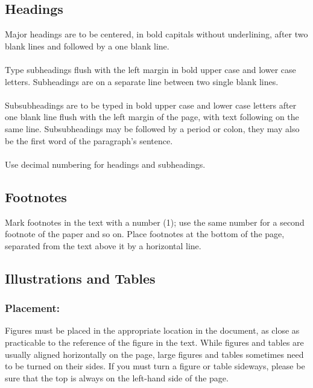 \documentclass{isprs}
\begin{document}
\subsection{Headings}\label{sec:Headings}

Major headings are to be centered, in bold capitals without 
underlining, after two blank lines and followed by a one blank line.\\
\\
Type subheadings flush with the left margin in bold upper case and lower 
case letters. Subheadings are on a separate line between two single blank lines.\\
 \\
Subsubheadings are to be typed in bold upper case and lower case letters 
after one blank line flush with the left margin of the page, with text 
following on the same line. Subsubheadings may be followed by a period 
or colon, they may also be the first word of the paragraph's sentence.\\
 \\
Use decimal numbering for headings and subheadings.


\subsection{Footnotes}\label{sec:Footnotes}

Mark footnotes in the text with a number (1); use the same number for a 
second footnote of the paper and so on. Place footnotes at the bottom of 
the page, separated from the text above it by a horizontal line.


\subsection{Illustrations and Tables}\label{sec:Illustrations and Tables}

\subsubsection{Placement:}\label{sec:Placement}

Figures must be placed in the appropriate location in the document, 
as close as practicable to the reference of the figure in the text. 
While figures and tables are usually aligned horizontally on the page, 
large figures and tables sometimes need to be turned on their sides. 
If you must turn a figure or table sideways, please be sure that the 
top is always on the left-hand side of the page.
\end{document}
